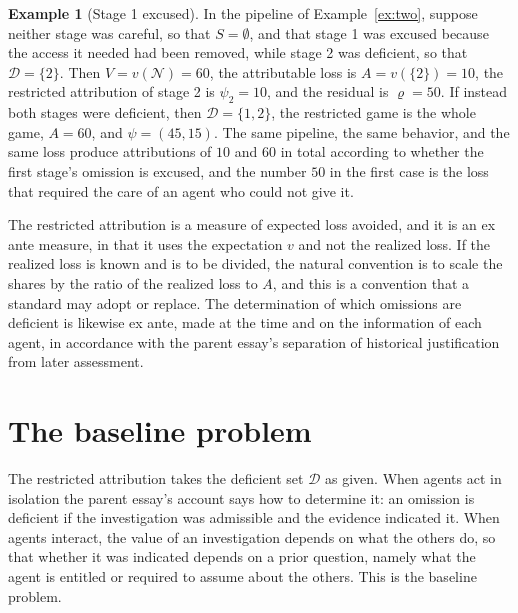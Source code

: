 \documentclass[11pt]{article}
\newcommand{\N}{\mathcal N}
\newcommand{\Dfc}{\mathcal D}
\theoremstyle{plain}
\theoremstyle{definition}
\newtheorem{example}{Example}
\begin{document}
\begin{example}[Stage 1 excused]\label{ex:excused}
In the pipeline of Example~\ref{ex:two}, suppose neither stage was careful, so that $S=\emptyset$, and that stage 1 was excused because the access it needed had been removed, while stage 2 was deficient, so that $\Dfc=\{2\}$. Then $V=v(\N)=60$, the attributable loss is $A=v(\{2\})=10$, the restricted attribution of stage 2 is $\psi_2=10$, and the residual is $\varrho=50$. If instead both stages were deficient, then $\Dfc=\{1,2\}$, the restricted game is the whole game, $A=60$, and $\psi=(45,15)$. The same pipeline, the same behavior, and the same loss produce attributions of $10$ and $60$ in total according to whether the first stage's omission is excused, and the number $50$ in the first case is the loss that required the care of an agent who could not give it.
\end{example}

The restricted attribution is a measure of expected loss avoided, and it is an ex ante measure, in that it uses the expectation $v$ and not the realized loss. If the realized loss is known and is to be divided, the natural convention is to scale the shares by the ratio of the realized loss to $A$, and this is a convention that a standard may adopt or replace. The determination of which omissions are deficient is likewise ex ante, made at the time and on the information of each agent, in accordance with the parent essay's separation of historical justification from later assessment.

\section{The baseline problem}\label{sec:baseline}

The restricted attribution takes the deficient set $\Dfc$ as given. When agents act in isolation the parent essay's account says how to determine it: an omission is deficient if the investigation was admissible and the evidence indicated it. When agents interact, the value of an investigation depends on what the others do, so that whether it was indicated depends on a prior question, namely what the agent is entitled or required to assume about the others. This is the baseline problem.
\end{document}
